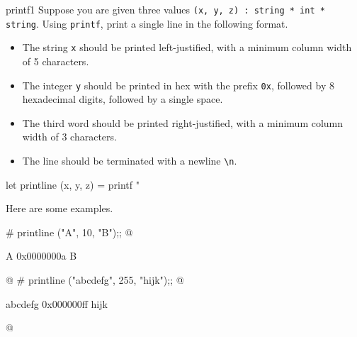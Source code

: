 %
\begin{exercise}{printf1}
Suppose you are given three values
\hbox{\lstinline+(x, y, z) : string * int * string+}.
Using \hbox{\lstinline+printf+}, print a single line in the following
format.

\begin{itemize}
\item

The string \hbox{\lstinline+x+} should be printed left-justified, with
a minimum column width of 5 characters.
\item

The integer \hbox{\lstinline+y+} should be printed in hex with the
prefix \hbox{\lstinline+0x+}, followed by 8 hexadecimal digits,
followed by a single space.
\item

The third word should be printed right-justified, with a minimum
column width of 3 characters.
\item

The line should be terminated with a newline \hbox{\lstinline+\n+}.
\end{itemize}

\begin{answer}\ifanswers
\begin{ocaml}
let printline (x, y, z) =
   printf "%
\end{ocaml}

Here are some examples.
\begin{ocaml}
# printline ("A", 10, "B");;
@
\begin{topoutput}
A     0x0000000a   B
\end{topoutput}
@
# printline ("abcdefg", 255, "hijk");;
@
\begin{topoutput}
abcdefg 0x000000ff hijk
\end{topoutput}
@
\end{ocaml}
\fi\end{answer}
\end{exercise}

